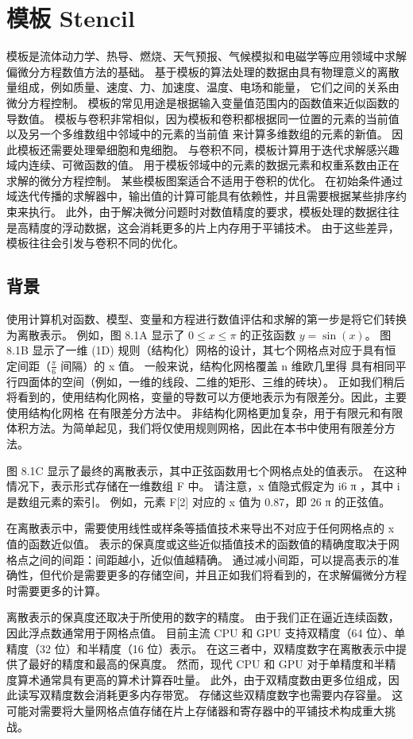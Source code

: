 \section{模板 Stencil}
模板是流体动力学、热导、燃烧、天气预报、气候模拟和电磁学等应用领域中求解偏微分方程数值方法的基础。 
基于模板的算法处理的数据由具有物理意义的离散量组成，例如质量、速度、力、加速度、温度、电场和能量，
它们之间的关系由微分方程控制。 模板的常见用途是根据输入变量值范围内的函数值来近似函数的导数值。 
模板与卷积非常相似，因为模板和卷积都根据同一位置的元素的当前值以及另一个多维数组中邻域中的元素的当前值
来计算多维数组的元素的新值。 因此模板还需要处理晕细胞和鬼细胞。 与卷积不同，模板计算用于迭代求解感兴趣域内连续、可微函数的值。 
用于模板邻域中的元素的数据元素和权重系数由正在求解的微分方程控制。 某些模板图案适合不适用于卷积的优化。 
在初始条件通过域迭代传播的求解器中，输出值的计算可能具有依赖性，并且需要根据某些排序约束来执行。 
此外，由于解决微分问题时对数值精度的要求，模板处理的数据往往是高精度的浮动数据，这会消耗更多的片上内存用于平铺技术。 
由于这些差异，模板往往会引发与卷积不同的优化。

\subsection{背景}
使用计算机对函数、模型、变量和方程进行数值评估和求解的第一步是将它们转换为离散表示。 
例如，图 8.1A 显示了 $0 \leq x \leq \pi$ 的正弦函数 $y = \sin(x)$。 
图 8.1B 显示了一维 (1D) 规则（结构化）网格的设计，其七个网格点对应于具有恒定间距（$\frac{\pi}{6}$ 间隔）的 x 值。
一般来说，结构化网格覆盖 n 维欧几里得 具有相同平行四面体的空间（例如，一维的线段、二维的矩形、三维的砖块）。
正如我们稍后将看到的，使用结构化网格，变量的导数可以方便地表示为有限差分。因此，主要使用结构化网格 在有限差分方法中。
非结构化网格更加复杂，用于有限元和有限体积方法。为简单起见，我们将仅使用规则网格，因此在本书中使用有限差分方法。

图 8.1C 显示了最终的离散表示，其中正弦函数用七个网格点处的值表示。 在这种情况下，表示形式存储在一维数组 F 中。
请注意，x 值隐式假定为 i6 π ，其中 i 是数组元素的索引。 例如，元素 F[2] 对应的 x 值为 0.87，即 26 π 的正弦值。

在离散表示中，需要使用线性或样条等插值技术来导出不对应于任何网格点的 x 值的函数近似值。 
表示的保真度或这些近似插值技术的函数值的精确度取决于网格点之间的间距：间距越小，近似值越精确。 
通过减小间距，可以提高表示的准确性，但代价是需要更多的存储空间，并且正如我们将看到的，在求解偏微分方程时需要更多的计算。

离散表示的保真度还取决于所使用的数字的精度。 由于我们正在逼近连续函数，因此浮点数通常用于网格点值。 
目前主流 CPU 和 GPU 支持双精度（64 位）、单精度（32 位）和半精度（16 位）表示。 
在这三者中，双精度数字在离散表示中提供了最好的精度和最高的保真度。 
然而，现代 CPU 和 GPU 对于单精度和半精度算术通常具有更高的算术计算吞吐量。 
此外，由于双精度数由更多位组成，因此读写双精度数会消耗更多内存带宽。 存储这些双精度数字也需要内存容量。 
这可能对需要将大量网格点值存储在片上存储器和寄存器中的平铺技术构成重大挑战。

